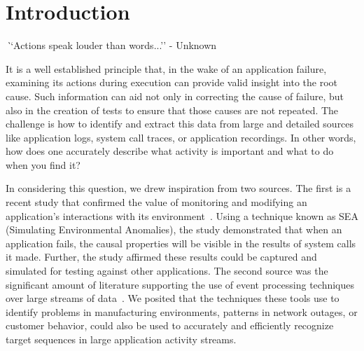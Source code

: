 \section{Introduction}
\label{SEC:introduction}


{\textit ``Actions speak louder than words...'' - Unknown}


It is a well established principle
that, in the wake of an application failure,
examining its actions
during execution can provide valid insight
into the root cause.
Such information
can aid not only in correcting
the cause of failure,
but also in the creation
of tests to ensure
that those causes
are not repeated.
The challenge is 
how to identify and extract this data
from large and detailed sources like application logs,
system call traces,
or application recordings.
In other words, how does one
accurately describe what activity is important
and what to do when you find it?

In considering this question,  we drew inspiration from two sources. The
first is a recent study that confirmed the value of monitoring and
modifying an application’s  interactions with its environment~\cite{DBLP:conf/issre/MooreCFW19}.  Using a technique known as SEA (Simulating Environmental Anomalies),  the study demonstrated that when an application fails, the causal properties
will be visible in the results of system calls it made. Further, the study affirmed these results could
be captured and simulated for testing against other applications.  The
second source was the significant amount of literature supporting the use of event
processing techniques over large streams of data~\cite{DBLP:conf/sigmod/AgrawalDGI08,DBLP:conf/debs/Hirzel12,DBLP:journals/ibmrd/HirzelAGJKKMNSSW13,DBLP:journals/csur/DayarathnaP18}. We posited that the techniques these tools
use to identify problems in  manufacturing environments, patterns in
network outages, or customer behavior, could also be used to accurately and efficiently recognize target
sequences in large
application activity streams.

